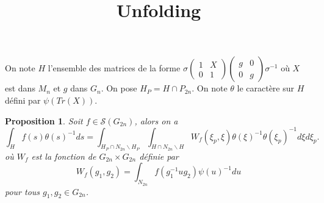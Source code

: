 \documentclass{amsart}
\newtheorem{proposition}{Proposition}[section]
\begin{document}
\title{Unfolding}
\maketitle 
 
 On note $H$ l'ensemble des matrices de la forme $\sigma \begin{pmatrix}
1 & X \\
0 & 1
\end{pmatrix}\begin{pmatrix}
g & 0 \\
0 & g
\end{pmatrix} \sigma^{-1}$ où $X$ est dans $M_n$ et $g$ dans $G_n$. On pose $H_P = H \cap P_{2n}$. On note $\theta$ le caractère sur $H$ défini par $\psi(Tr(X))$.

\begin{proposition}
Soit $f \in \mathcal{S}(G_{2n})$, alors on a
\begin{equation}
\int_{H} f(s) \theta(s)^{-1} ds = \int_{H_P \cap N_{2n} \backslash{H_P}} \int_{H \cap N_{2n} \backslash{H}} W_f(\xi_p, \xi) \theta(\xi)^{-1} \theta(\xi_p)^{-1} d\xi d\xi_p .
\end{equation}
où $W_f$ est la fonction de $G_{2n} \times G_{2n}$ définie par
\begin{equation}
W_f(g_1,g_2) = \int_{N_{2n}} f(g_1^{-1}ug_2) \psi(u)^{-1} du
\end{equation}
pour tous $g_1, g_2 \in G_{2n}$.
\end{proposition}
\end{document}
